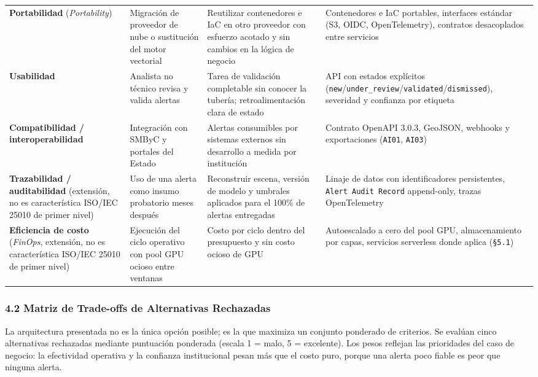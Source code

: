 \documentclass{article}
\begin{document}
{\begin{longtable}{@{}L{1.47in}L{1.24in}L{1.47in}L{1.77in}@{}}
\textbf{Portabilidad} (\emph{Portability}) & Migración de proveedor de nube o sustitución del motor vectorial & Reutilizar contenedores e IaC en otro proveedor con esfuerzo acotado y sin cambios en la lógica de negocio & Contenedores e IaC portables, interfaces estándar (S3, OIDC, OpenTelemetry), contratos desacoplados entre servicios \\
\textbf{Usabilidad} & Analista no técnico revisa y valida alertas & Tarea de validación completable sin conocer la tubería; retroalimentación clara de estado & API con estados explícitos (\texttt{new}/\texttt{under\_\allowbreak{}review}/\texttt{validated}/\texttt{dismissed}), severidad y confianza por etiqueta \\
\textbf{Compatibilidad / interoperabilidad} & Integración con SMByC y portales del Estado & Alertas consumibles por sistemas externos sin desarrollo a medida por institución & Contrato OpenAPI 3.0.3, GeoJSON, webhooks y exportaciones (\texttt{AI01}, \texttt{AI03}) \\
\textbf{Trazabilidad / auditabilidad} (extensión, no es característica ISO/IEC 25010 de primer nivel) & Uso de una alerta como insumo probatorio meses después & Reconstruir escena, versión de modelo y umbrales aplicados para el 100\% de alertas entregadas & Linaje de datos con identificadores persistentes, \texttt{Alert Audit Record} append-only, trazas OpenTelemetry \\
\textbf{Eficiencia de costo} (\emph{FinOps}, extensión, no es característica ISO/IEC 25010 de primer nivel) & Ejecución del ciclo operativo con pool GPU ocioso entre ventanas & Costo por ciclo dentro del presupuesto y sin costo ocioso de GPU & Autoescalado a cero del pool GPU, almacenamiento por capas, servicios serverless donde aplica (\texttt{\S{}5.\allowbreak{}1}) \\
\end{longtable}
}

\subsubsection{4.2 Matriz de Trade-offs de Alternativas Rechazadas}

La arquitectura presentada no es la única opción posible; es la que maximiza un conjunto ponderado de criterios. Se evalúan cinco alternativas rechazadas mediante puntuación ponderada (escala 1 = malo, 5 = excelente). Los pesos reflejan las prioridades del caso de negocio: la efectividad operativa y la confianza institucional pesan más que el costo puro, porque una alerta poco fiable es peor que ninguna alerta.
\end{document}
